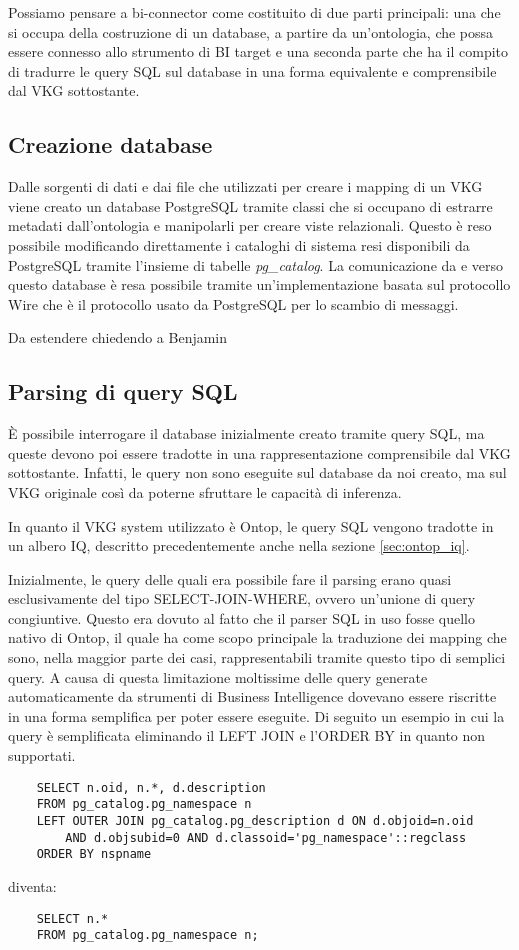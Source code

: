 Possiamo pensare a bi-connector come costituito di due parti principali: una che si occupa della costruzione di un database, a partire da un'ontologia, che possa essere connesso allo strumento di BI target e una seconda parte che ha il compito di tradurre le query
SQL sul database in una forma equivalente e comprensibile dal VKG sottostante.

\subsection{Creazione database}
\label{sec:bi-connector_db}
Dalle sorgenti di dati e dai file che utilizzati per creare i mapping di un VKG viene creato un database PostgreSQL tramite classi che si occupano di estrarre metadati dall'ontologia e manipolarli per creare viste relazionali.
Questo è reso possibile modificando direttamente i cataloghi di sistema resi disponibili da PostgreSQL tramite l'insieme di tabelle \textit{pg\_catalog}.
La comunicazione da e verso questo database è resa possibile tramite un'implementazione basata sul protocollo Wire che è il protocollo usato da PostgreSQL per lo scambio di messaggi.

Da estendere chiedendo a Benjamin

\subsection{Parsing di query SQL}
\label{sec:bi-connector_parsing}
\`E possibile interrogare il database inizialmente creato tramite query SQL, ma queste devono poi essere tradotte in una rappresentazione comprensibile dal VKG sottostante. Infatti, le query non sono eseguite sul database da noi creato, ma sul
VKG originale così da poterne sfruttare le capacità di inferenza.

In quanto il VKG system utilizzato è Ontop, le query SQL vengono tradotte in un albero IQ, descritto precedentemente anche nella sezione \ref{sec:ontop_iq}.

Inizialmente, le query delle quali era possibile fare il parsing erano quasi esclusivamente del tipo SELECT-JOIN-WHERE, ovvero un'unione di query congiuntive. Questo era dovuto al fatto che il parser SQL in uso fosse quello nativo di Ontop,
il quale ha come scopo principale la traduzione dei mapping che sono, nella maggior parte dei casi, rappresentabili tramite questo tipo di semplici query.
A causa di questa limitazione moltissime delle query generate automaticamente da strumenti di Business Intelligence dovevano essere riscritte in una forma semplifica per poter essere eseguite.
Di seguito un esempio in cui la query è semplificata eliminando il LEFT JOIN e l'ORDER BY in quanto non supportati.
\begin{verbatim}
    SELECT n.oid, n.*, d.description 
    FROM pg_catalog.pg_namespace n
    LEFT OUTER JOIN pg_catalog.pg_description d ON d.objoid=n.oid 
        AND d.objsubid=0 AND d.classoid='pg_namespace'::regclass
    ORDER BY nspname
\end{verbatim}    
diventa:
\begin{verbatim}
    SELECT n.* 
    FROM pg_catalog.pg_namespace n;
\end{verbatim}

